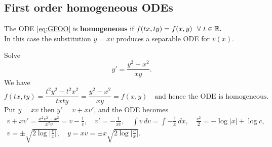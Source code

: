 \subsection{First order homogeneous ODEs}
The ODE \eqref{eq:GFOO} is \textbf{homogeneous} if $f(tx,ty)=f(x,y)\ \ \forall \ t\in\bb{R}.$\\

In this case the substitution $y=xv$ produces a separable ODE for $v(x).$\\ 

\begin{example}
    Solve \[y'=\frac{y^2-x^2}{xy}.\]
    We have \[f(tx,ty)=\frac{t^2y^2-t^2x^2}{txty}=\frac{y^2-x^2}{xy}=f(x,y) \quad \text{and hence the ODE is homogeneous.}\]  
    Put $y=xv$ then $y'=v+xv'$, and the ODE becomes
    \begin{equation*}
        \begin{gathered}
            v+xv'=\frac{x^2v^2-x^2}{x^2v}=v-\frac{1}{v}, \quad v'=-\frac{1}{xv}, \quad \int v\,dv=\int -\frac{1}{x}\,dx, \quad \frac{v^2}{2}=-\log|x|+\log c, \\
            v=\pm \sqrt{2\log\bigg|\frac{c}{x}\bigg|}, \quad y=xv=\pm x\sqrt{2\log\bigg|\frac{c}{x}\bigg|}.
        \end{gathered}
    \end{equation*}
\end{example} 
\newpage
 
